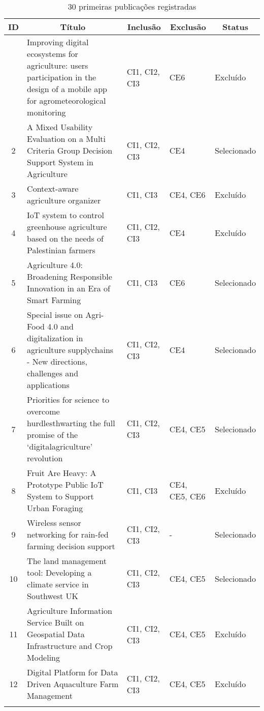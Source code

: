 \documentclass[12pt]{article}
\begin{document}
\begin{footnotesize}
	\begin{longtable}{|c|p{7cm}|p{2cm}|p{2cm}|p{1.6cm}|}
		\hline 
		\multicolumn{1}{|c|}{\textbf{ID}} & 
		\multicolumn{1}{c|}{\textbf{Título}} & 
		\multicolumn{1}{c|}{\textbf{Inclusão}} &
		\multicolumn{1}{c|}{\textbf{Exclusão}} &
		\multicolumn{1}{c|}{\textbf{Status}} \\ \hline 
		\endfirsthead
		\endhead
		\endfoot
		\endlastfoot
		1 & Improving digital ecosystems for agriculture: users participation in the design of a mobile app for agrometeorological monitoring & CI1, CI2, CI3 & CE6 & Excluído \\ \hline
		2 & A Mixed Usability Evaluation on a Multi Criteria Group Decision Support System in Agriculture & CI1, CI2, CI3 & CE4 & Selecionado \\ \hline
		3 & Context-aware agriculture organizer & CI1, CI3 & CE4, CE6 & Excluído \\ \hline
		4 & IoT system to control greenhouse agriculture based on the needs of Palestinian farmers & CI1, CI2, CI3 & CE4 & Excluído \\ \hline
		5 & Agriculture 4.0: Broadening Responsible Innovation in an Era of Smart Farming & CI1, CI3 & CE6 & Selecionado \\ \hline
		6 & Special issue on Agri-Food 4.0 and digitalization in agriculture supplychains - New directions, challenges and applications & CI1, CI2, CI3 & CE4 & Selecionado \\ \hline
		7 & Priorities for science to overcome hurdlesthwarting the full promise of the ‘digitalagriculture’ revolution & CI1, CI2, CI3 & CE4, CE5 & Selecionado \\ \hline
		8 & Fruit Are Heavy: A Prototype Public IoT System to Support Urban Foraging & CI1, CI3 & CE4, CE5, CE6 & Excluído \\ \hline
		9 & Wireless sensor networking for rain-fed farming decision support & CI1, CI2, CI3 & - & Selecionado \\ \hline
		10 & The land management tool: Developing a climate service in Southwest UK & CI1, CI2, CI3 & CE4, CE5 & Selecionado \\ \hline
		11 & Agriculture Information Service Built on Geospatial Data Infrastructure and Crop Modeling & CI1, CI2, CI3 & CE4, CE5 & Excluído \\ \hline
		12 & Digital Platform for Data Driven Aquaculture Farm Management & CI1, CI2, CI3 & CE4, CE5 & Excluído \\ \hline
			\caption{30 primeiras publicações registradas} \label{tab:filtro2} \\
		\end{longtable}
	\end{footnotesize}
\end{document}
